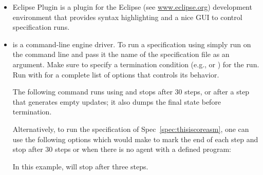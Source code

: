\documentclass{article}
\newcommand{\specref}[1]{Spec~\ref{spec:#1}}
\renewcommand{\url}[1]{\href{http://#1}{{\ttfamily #1}}}
\begin{document}
\begin{itemize}
	\item \CoreASM Eclipse Plugin is a plugin for the Eclipse (see \url{www.eclipse.org}) 
		development environment that provides syntax highlighting and a nice GUI to control 
		specification runs.

	\item \Carma is a command-line \CoreASM engine driver. To run a specification using 
		\Carma simply run \Carma on the command line and pass it the name of the specification 
		file as an argument. Make sure to specify a termination condition (e.g., 
		or ) for the run.
		Run \Carma with  for a complete list of options that controls its behavior.  

		The following command runs  using \Carma and stops after 30 steps, or after
		a step that generates empty updates; it also dumps the final state before termination.

		\begin{quote} \end{quote} 

		Alternatively, to run the specification of \specref{thisiscoreasm}, one can use the following options which would make \Carma to mark the end of each step and stop after 30 steps or when there is no agent with a defined program:

		\begin{quote} \end{quote} 

		In this example, \Carma will stop after three steps.

\end{itemize}
\end{document}
